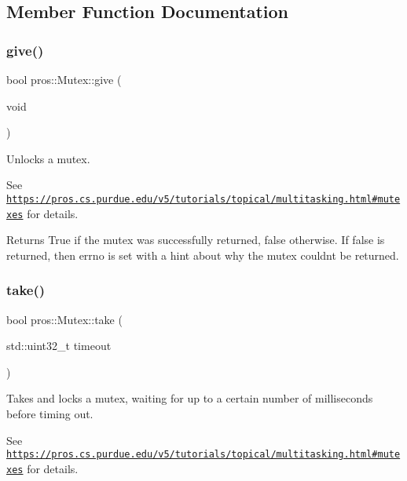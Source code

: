 \subsection{Member Function Documentation}
\mbox{\label{classpros_1_1Mutex_a1c3e7ee193608a27a5a509ee7930363b}} 
\subsubsection{\texorpdfstring{give()}{give()}}
{\footnotesize\ttfamily bool pros\+::\+Mutex\+::give (\begin{DoxyParamCaption}\item[{void}]{ }\end{DoxyParamCaption})}



Unlocks a mutex. 

See \href{https://pros.cs.purdue.edu/v5/tutorials/topical/multitasking.html#mutexes}{\tt https\+://pros.\+cs.\+purdue.\+edu/v5/tutorials/topical/multitasking.\+html\#mutexes} for details.

\begin{DoxyReturn}{Returns}
True if the mutex was successfully returned, false otherwise. If false is returned, then errno is set with a hint about why the mutex couldn\textquotesingle{}t be returned. 
\end{DoxyReturn}
\mbox{\label{classpros_1_1Mutex_a70da733375f7b4b68475881578c78516}} 
\subsubsection{\texorpdfstring{take()}{take()}}
{\footnotesize\ttfamily bool pros\+::\+Mutex\+::take (\begin{DoxyParamCaption}\item[{std\+::uint32\+\_\+t}]{timeout }\end{DoxyParamCaption})}



Takes and locks a mutex, waiting for up to a certain number of milliseconds before timing out. 

See \href{https://pros.cs.purdue.edu/v5/tutorials/topical/multitasking.html#mutexes}{\tt https\+://pros.\+cs.\+purdue.\+edu/v5/tutorials/topical/multitasking.\+html\#mutexes} for details.


